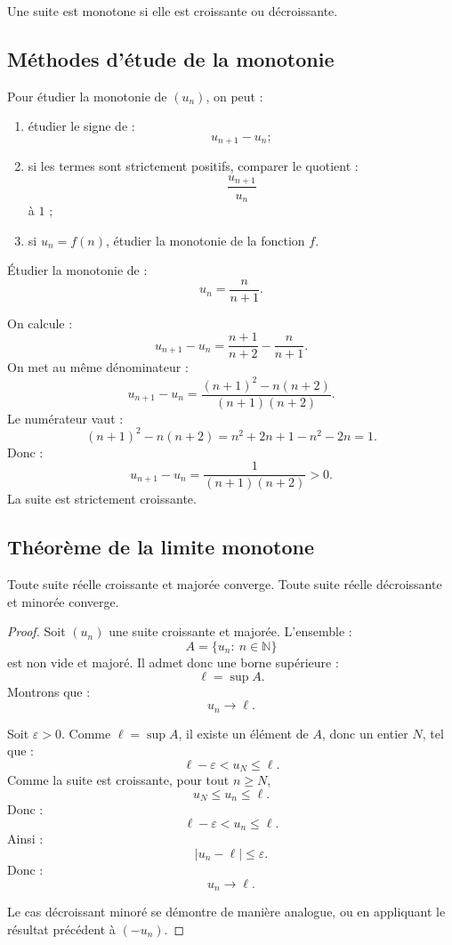 \documentclass[11pt,a4paper]{article}
\newcommand{\N}{\mathbb N}
\newcommand{\abs}[1]{\left|#1\right|}
\begin{document}
\begin{definitionbox}
Une suite est monotone si elle est croissante ou décroissante.
\end{definitionbox}

\subsection{Méthodes d'étude de la monotonie}

\begin{methodbox}
Pour étudier la monotonie de \((u_n)\), on peut :
\begin{enumerate}
    \item étudier le signe de :
    \[
    u_{n+1}-u_n ;
    \]
    \item si les termes sont strictement positifs, comparer le quotient :
    \[
    \frac{u_{n+1}}{u_n}
    \]
    à \(1\) ;
    \item si \(u_n=f(n)\), étudier la monotonie de la fonction \(f\).
\end{enumerate}
\end{methodbox}

\begin{exercicebox}[Monotonie]
Étudier la monotonie de :
\[
u_n=\frac{n}{n+1}.
\]
\end{exercicebox}

\begin{correctionbox}
On calcule :
\[
u_{n+1}-u_n
=
\frac{n+1}{n+2}-\frac{n}{n+1}.
\]
On met au même dénominateur :
\[
u_{n+1}-u_n
=
\frac{(n+1)^2-n(n+2)}{(n+1)(n+2)}.
\]
Le numérateur vaut :
\[
(n+1)^2-n(n+2)
=
n^2+2n+1-n^2-2n
=
1.
\]
Donc :
\[
u_{n+1}-u_n=\frac1{(n+1)(n+2)}>0.
\]
La suite est strictement croissante.
\end{correctionbox}

\subsection{Théorème de la limite monotone}

\begin{theorembox}
Toute suite réelle croissante et majorée converge.  
Toute suite réelle décroissante et minorée converge.
\end{theorembox}

\begin{proof}
Soit \((u_n)\) une suite croissante et majorée.  
L'ensemble :
\[
A=\{u_n:\ n\in\N\}
\]
est non vide et majoré.  
Il admet donc une borne supérieure :
\[
\ell=\sup A.
\]
Montrons que :
\[
u_n\to\ell.
\]

Soit \(\varepsilon>0\).  
Comme \(\ell=\sup A\), il existe un élément de \(A\), donc un entier \(N\), tel que :
\[
\ell-\varepsilon<u_N\leq \ell.
\]
Comme la suite est croissante, pour tout \(n\geq N\),
\[
u_N\leq u_n\leq \ell.
\]
Donc :
\[
\ell-\varepsilon<u_n\leq \ell.
\]
Ainsi :
\[
\abs{u_n-\ell}\leq\varepsilon.
\]
Donc :
\[
u_n\to\ell.
\]

Le cas décroissant minoré se démontre de manière analogue, ou en appliquant le résultat précédent à \((-u_n)\).
\end{proof}
\end{document}
